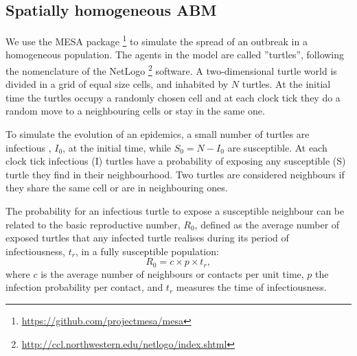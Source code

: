 \documentclass[a4paper,oneside,11pt]{article}
\begin{document}
\subsection{Spatially homogeneous ABM}

We use the MESA package \footnote{\url{https://github.com/projectmesa/mesa}} to simulate the spread of an outbreak in a homogeneous population. The agents in the model are called ''turtles'', following the nomenclature of the NetLogo \footnote{\url{http://ccl.northwestern.edu/netlogo/index.shtml}} software. 
A two-dimensional turtle world is divided in a grid of equal size cells, and inhabited by $N$ turtles. At the initial time the turtles occupy a randomly chosen cell and  at each clock tick they do a random move to a neighbouring cells or stay in the same one. 

To simulate the evolution of an epidemics, a small number of turtles are infectious , $I_0$, at the initial time, while $S_0 = N-I_0$ are susceptible. At each clock tick infectious (I) turtles have a probability of exposing any susceptible (S) turtle they find in their neighbourhood. Two turtles are considered neighbours if they share the same cell or are in  neighbouring ones. 

The probability for an infectious turtle to expose a susceptible neighbour can be related to the basic reproductive number, $R_0$,  defined as the average number of exposed turtles that any infected turtle realises during its period of infectiousness, $t_r$, in a fully susceptible population: 
\begin{equation}
R_0 = c \times p \times t_r,
\label{eq:r0cptr}
\end{equation}
where $c$ is the average number of neighbours or contacts per unit time, $p$ the infection probability per contact, and $t_r$ measures the time of infectiousness. 
\end{document}
